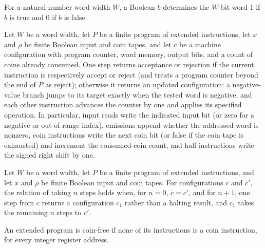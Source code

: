\begin{definition}
\label{WordRAM.coinWord}
\leanok
For a natural-number word width $W$, a Boolean $b$ determines the $W$-bit word $1$ if
$b$ is true and $0$ if $b$ is false.
\end{definition}

\begin{definition}
\label{WordRAM.xstep}
\leanok
{}
Let $W$ be a word width, let $P$ be a finite program of extended instructions, let $x$
and $\rho$ be finite Boolean input and coin tapes, and let $c$ be a machine
configuration with program counter, word memory, output bits, and a count of coins
already consumed. One step returns acceptance or rejection if the current instruction is
respectively accept or reject (and treats a program counter beyond the end of $P$ as
reject); otherwise it returns an updated configuration: a negative-value branch jumps to
its target exactly when the tested word is negative, and each other instruction advances
the counter by one and applies its specified operation. In particular, input reads write
the indicated input bit (or zero for a negative or out-of-range index), emissions append
whether the addressed word is nonzero, coin instructions write the next coin bit (or
false if the coin tape is exhausted) and increment the consumed-coin count, and half
instructions write the signed right shift by one.
\end{definition}

\begin{definition}
\label{WordRAM.XSteps}
\leanok
{}
Let $W$ be a word width, let $P$ be a finite program of extended instructions, and let
$x$ and $\rho$ be finite Boolean input and coin tapes. For configurations $c$ and $c'$,
the relation of taking $n$ steps holds when, for $n=0$, $c=c'$, and for $n+1$, one step
from $c$ returns a configuration $c_1$ rather than a halting result, and $c_1$ takes the
remaining $n$ steps to $c'$.
\end{definition}

\begin{definition}
\label{WordRAM.CoinFree}
\leanok
{}
An extended program is coin-free if none of its instructions is a coin instruction, for
every integer register address.
\end{definition}

